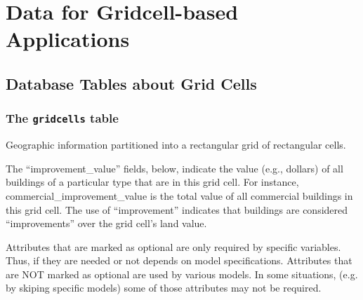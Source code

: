 \chapter{Data for Gridcell-based Applications}


\section{Database Tables about Grid Cells}
\label{sec:gridcell-tables}

\subsection{The {\tt gridcells} table}

Geographic information partitioned into a rectangular grid of rectangular cells.

The ``improvement_value'' fields, below, indicate the value (e.g., dollars) of
all buildings of a particular type that are in this grid cell. For instance,
commercial_improvement_value is the total value of all commercial buildings in
this grid cell. The use of ``improvement'' indicates that buildings are
considered ``improvements'' over the grid cell's land value.

Attributes that are marked as optional are only required by specific variables. Thus,
if they are needed or not depends on model specifications.
Attributes that are NOT marked as optional are used by various models. In some situations,
(e.g. by skiping specific models) some of those attributes may not be required. 

